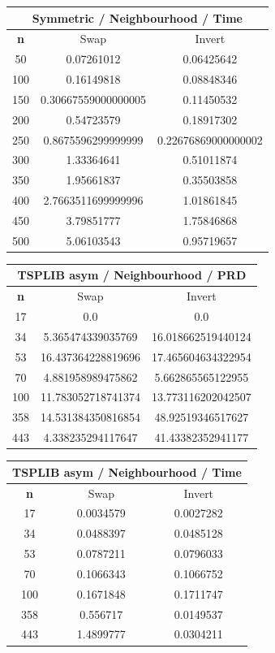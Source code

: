 \documentclass{article}
\begin{document}
\begin{center}
\begin{tabular}{|c|c|c|}
\hline
\multicolumn{3}{|c|}{\textbf{Symmetric / Neighbourhood / Time}}\\
\hline
\textbf{n} & Swap & Invert\\
\hline
50 & 0.07261012 & 0.06425642\\
\hline
100 & 0.16149818 & 0.08848346\\
\hline
150 & 0.30667559000000005 & 0.11450532\\
\hline
200 & 0.54723579 & 0.18917302\\
\hline
250 & 0.8675596299999999 & 0.22676869000000002\\
\hline
300 & 1.33364641 & 0.51011874\\
\hline
350 & 1.95661837 & 0.35503858\\
\hline
400 & 2.7663511699999996 & 1.01861845\\
\hline
450 & 3.79851777 & 1.75846868\\
\hline
500 & 5.06103543 & 0.95719657\\
\hline
\end{tabular}
\end{center}


\begin{center}
\begin{tabular}{|c|c|c|}
\hline
\multicolumn{3}{|c|}{\textbf{TSPLIB asym / Neighbourhood / PRD}}\\
\hline
\textbf{n} & Swap & Invert\\
\hline
17 & 0.0 & 0.0\\
\hline
34 & 5.365474339035769 & 16.018662519440124\\
\hline
53 & 16.437364228819696 & 17.465604634322954\\
\hline
70 & 4.881958989475862 & 5.662865565122955\\
\hline
100 & 11.783052718741374 & 13.773116202042507\\
\hline
358 & 14.531384350816854 & 48.92519346517627\\
\hline
443 & 4.338235294117647 & 41.43382352941177\\
\hline
\end{tabular}
\end{center}


\begin{center}
\begin{tabular}{|c|c|c|}
\hline
\multicolumn{3}{|c|}{\textbf{TSPLIB asym / Neighbourhood / Time}}\\
\hline
\textbf{n} & Swap & Invert\\
\hline
17 & 0.0034579 & 0.0027282\\
\hline
34 & 0.0488397 & 0.0485128\\
\hline
53 & 0.0787211 & 0.0796033\\
\hline
70 & 0.1066343 & 0.1066752\\
\hline
100 & 0.1671848 & 0.1711747\\
\hline
358 & 0.556717 & 0.0149537\\
\hline
443 & 1.4899777 & 0.0304211\\
\hline
\end{tabular}
\end{center}
\end{document}

